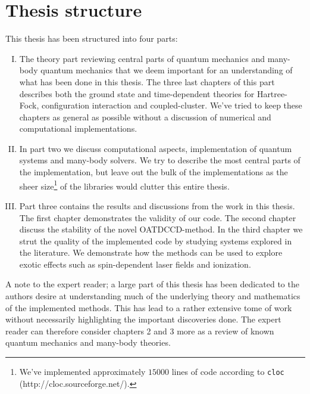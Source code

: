     \section{Thesis structure}
        This thesis has been structured into four parts:
        \begin{enumerate}[I.]
            \item The theory part reviewing central parts of quantum mechanics
                and many-body quantum mechanics that we deem important for an
                understanding of what has been done in this thesis.
                The three last chapters of this part describes both the ground
                state and time-dependent theories for Hartree-Fock,
                configuration interaction and coupled-cluster.
                We've tried to keep these chapters as general as possible
                without a discussion of numerical and computational
                implementations.
            \item In part two we discuss computational aspects, implementation
                of quantum systems and many-body solvers.
                We try to describe the most central parts of the implementation,
                but leave out the bulk of the implementations as the sheer
                size\footnote{%
                    We've implemented approximately $15000$ lines of code
                    according to \texttt{cloc} (http://cloc.sourceforge.net/).
                }
                of the libraries would clutter this entire thesis.
            \item Part three contains the results and discussions from the work
                in this thesis.
                The first chapter demonstrates the validity of our code.
                The second chapter discuss the stability of the novel
                OATDCCD-method.
                In the third chapter we strut the quality of the implemented
                code by studying systems explored in the literature.
                We demonstrate how the methods can be used to explore exotic
                effects such as spin-dependent laser fields and ionization.
        \end{enumerate}
        A note to the expert reader; a large part of this thesis has been
        dedicated to the authors desire at understanding much of the underlying
        theory and mathematics of the implemented methods.
        This has lead to a rather extensive tome of work without necessarily
        highlighting the important discoveries done.
        The expert reader can therefore consider chapters 2 and 3 more as a
        review of known quantum mechanics and many-body theories.

